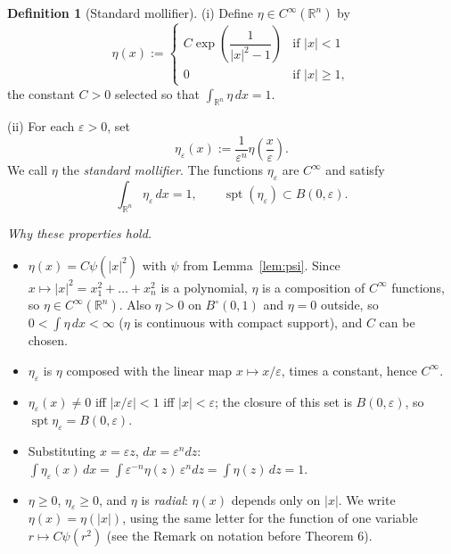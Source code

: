 \documentclass[11pt]{article}
\theoremstyle{plain}
\theoremstyle{definition}
\newtheorem{definition}[theorem]{Definition}
\theoremstyle{remark}
\begin{document}
\begin{definition}[Standard mollifier]\label{def:mollifier}
(i) Define $\eta \in C^\infty(\mathbb{R}^n)$ by
$$ \eta(x) := \begin{cases} C \exp\left( \dfrac{1}{|x|^2 - 1} \right) & \text{if } |x| < 1 \\ 0 & \text{if } |x| \geq 1, \end{cases} $$
the constant $C > 0$ selected so that $\int_{\mathbb{R}^n} \eta\, dx = 1$.

(ii) For each $\varepsilon > 0$, set
$$ \eta_\varepsilon(x) := \frac{1}{\varepsilon^n} \eta\left( \frac{x}{\varepsilon} \right). $$
We call $\eta$ the \emph{standard mollifier}. The functions $\eta_\varepsilon$ are $C^\infty$ and satisfy
$$ \int_{\mathbb{R}^n} \eta_\varepsilon\, dx = 1, \qquad \operatorname{spt}(\eta_\varepsilon) \subset B(0,\varepsilon). $$
\end{definition}

\emph{Why these properties hold.}
\begin{itemize}
    \item $\eta(x) = C\psi(|x|^2)$ with $\psi$ from Lemma~\ref{lem:psi}. Since $x \mapsto |x|^2 = x_1^2 + \dots + x_n^2$ is a polynomial, $\eta$ is a composition of $C^\infty$ functions, so $\eta \in C^\infty(\mathbb{R}^n)$. Also $\eta > 0$ on $B^\circ(0,1)$ and $\eta = 0$ outside, so $0 < \int \eta\, dx < \infty$ ($\eta$ is continuous with compact support), and $C$ can be chosen.
    \item $\eta_\varepsilon$ is $\eta$ composed with the linear map $x \mapsto x/\varepsilon$, times a constant, hence $C^\infty$.
    \item $\eta_\varepsilon(x) \ne 0$ iff $|x/\varepsilon| < 1$ iff $|x| < \varepsilon$; the closure of this set is $B(0,\varepsilon)$, so $\operatorname{spt}\eta_\varepsilon = B(0,\varepsilon)$.
    \item Substituting $x = \varepsilon z$, $dx = \varepsilon^n dz$: $\int \eta_\varepsilon(x)\, dx = \int \varepsilon^{-n}\eta(z)\, \varepsilon^n dz = \int \eta(z)\, dz = 1$.
    \item $\eta \geq 0$, $\eta_\varepsilon \ge 0$, and $\eta$ is \emph{radial}: $\eta(x)$ depends only on $|x|$. We write $\eta(x) = \eta(|x|)$, using the same letter for the function of one variable $r \mapsto C\psi(r^2)$ (see the Remark on notation before Theorem 6).
\end{itemize}
\end{document}
